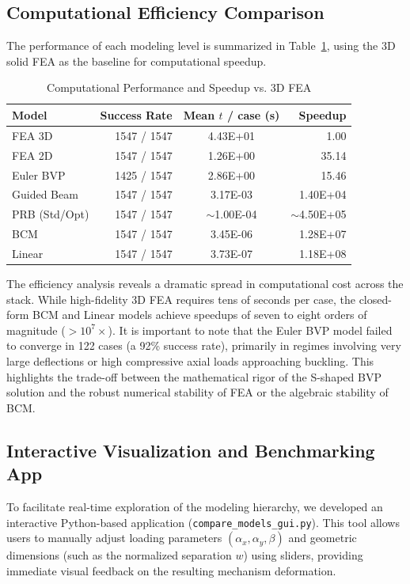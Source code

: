 \documentclass[colorlinks,upint,subscriptcorrection,varvw,hyphenate,balance]{asmeconf} %
\begin{document}
\subsection{Computational Efficiency Comparison}
The performance of each modeling level is summarized in Table~\ref{tab:runtime_comparison}, using the 3D solid FEA as the baseline for computational speedup.
\begin{table}[ht]
\centering
\caption{Computational Performance and Speedup vs. 3D FEA}
\label{tab:runtime_comparison}
\begin{tabular}{lrcr}
\toprule
\textbf{Model} & \textbf{Success Rate} & \textbf{Mean $t$ / case (s)} & \textbf{Speedup} \\
\midrule
FEA 3D & 1547 / 1547 & 4.43E+01 & 1.00 \\
FEA 2D & 1547 / 1547 & 1.26E+00 & 35.14 \\
Euler BVP & 1425 / 1547 & 2.86E+00 & 15.46 \\
Guided Beam & 1547 / 1547 & 3.17E-03 & 1.40E+04 \\
PRB (Std/Opt) & 1547 / 1547 & $\sim$1.00E-04 & $\sim$4.50E+05 \\
BCM & 1547 / 1547 & 3.45E-06 & 1.28E+07 \\
Linear & 1547 / 1547 & 3.73E-07 & 1.18E+08 \\
\bottomrule
\end{tabular}
\end{table}

The efficiency analysis reveals a dramatic spread in computational cost across the stack. While high-fidelity 3D FEA requires tens of seconds per case, the closed-form BCM and Linear models achieve speedups of seven to eight orders of magnitude ($>10^7\times$). It is important to note that the Euler BVP model failed to converge in 122 cases (a 92\% success rate), primarily in regimes involving very large deflections or high compressive axial loads approaching buckling. This highlights the trade-off between the mathematical rigor of the S-shaped BVP solution and the robust numerical stability of FEA or the algebraic stability of BCM.

\subsection{Interactive Visualization and Benchmarking App}
To facilitate real-time exploration of the modeling hierarchy, we developed an interactive Python-based application (\texttt{compare\_models\_gui.py}). This tool allows users to manually adjust loading parameters $(\alpha_x, \alpha_y, \beta)$ and geometric dimensions (such as the normalized separation $w$) using sliders, providing immediate visual feedback on the resulting mechanism deformation. 
\end{document}
